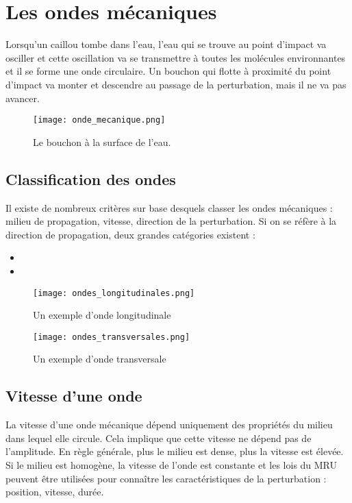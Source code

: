 \chapter{Les ondes mécaniques}
Lorsqu'un caillou tombe dans l'eau, l'eau qui se trouve au point d'impact va osciller et cette oscillation va se transmettre à toutes les molécules environnantes et il se forme une onde circulaire. Un bouchon qui flotte à proximité du point d'impact va monter et descendre au passage de la perturbation, mais il ne va pas avancer.

\begin{figure}[h!]
    \centering
    \texttt{[image: onde\_mecanique.png]}
    \caption{Le bouchon à la surface de l'eau.}
    \label{onde_mecanique}
\end{figure}

\newpage

\section{Classification des ondes}
Il existe de nombreux critères sur base desquels classer les ondes mécaniques : milieu de propagation, vitesse, direction de la perturbation. Si on se réfère à la direction de propagation, deux grandes catégories existent :
\begin{itemize}[label=\textbullet]
    \item {}
    \item {}
\end{itemize}

\begin{figure}[h!]
    \centering
    \texttt{[image: ondes\_longitudinales.png]}
    \caption{Un exemple d'onde longitudinale}
    \label{onde_longitudinale}
\end{figure}

\begin{figure}[h!]
    \centering
    \texttt{[image: ondes\_transversales.png]}
    \caption{Un exemple d'onde transversale}
    \label{onde_transversale}
\end{figure}

\newpage

\section{Vitesse d'une onde}
La vitesse d'une onde mécanique dépend uniquement des propriétés du milieu dans lequel elle circule. Cela implique que cette vitesse ne dépend pas de l'amplitude. En règle générale, plus le milieu est dense, plus la vitesse est élevée.
Si le milieu est homogène, la vitesse de l'onde est constante et les lois du MRU peuvent être utilisées pour connaître les caractéristiques de la perturbation : position, vitesse, durée.

